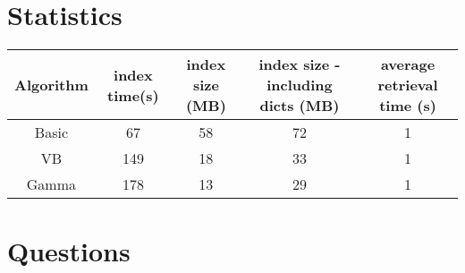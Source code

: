 \documentclass[10pt]{article}
\begin{document}
\section{Statistics}
\begin{table}[ht]
\begin{tabular}{| c | c | c | c | c |}
\hline
Algorithm & index time(s) & index size (MB) & index size - including dicts (MB) & average retrieval time (s)\\\hline
Basic & 67 & 58 & 72 & 1\\\hline
VB & 149 & 18 & 33 & 1\\\hline
Gamma & 178 & 13 & 29 & 1\\\hline
\end{tabular}
\end{table}
\section{Questions}
\end{document}
